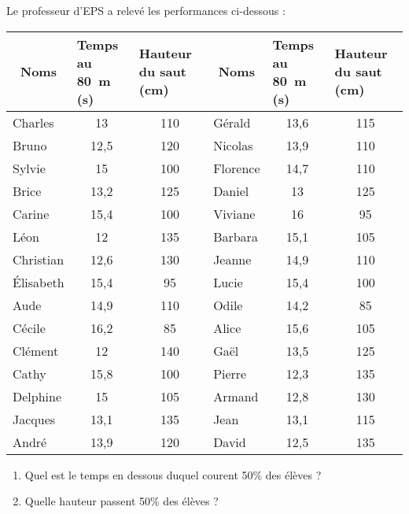 
Le professeur d'EPS a relevé les performances ci-dessous :
\begin{center}
  \begin{tabularx}{0.85\linewidth}{|l|X|X|l|X|X|}
    \hline
\multicolumn{1}{|c|}{Noms}&Temps au 80~m (s)&Hauteur du saut (cm)&\multicolumn{1}{c|}{Noms}&Temps au 80~m (s)&Hauteur du saut (cm)\\
\hline
Charles&\multicolumn{1}{c|}{13}&\multicolumn{1}{c|}{110}&Gérald&\multicolumn{1}{c|}{13,6}&\multicolumn{1}{c|}{115}\\
Bruno&\multicolumn{1}{c|}{12,5}&\multicolumn{1}{c|}{120}&Nicolas&\multicolumn{1}{c|}{13,9}&\multicolumn{1}{c|}{110}\\
Sylvie&\multicolumn{1}{c|}{15}&\multicolumn{1}{c|}{100}&Florence&\multicolumn{1}{c|}{14,7}&\multicolumn{1}{c|}{110}\\
Brice&\multicolumn{1}{c|}{13,2}&\multicolumn{1}{c|}{125}&Daniel&\multicolumn{1}{c|}{13}&\multicolumn{1}{c|}{125}\\
Carine&\multicolumn{1}{c|}{15,4}&\multicolumn{1}{c|}{100}&Viviane&\multicolumn{1}{c|}{16}&\multicolumn{1}{c|}{95}\\
Léon&\multicolumn{1}{c|}{12}&\multicolumn{1}{c|}{135}&Barbara&\multicolumn{1}{c|}{15,1}&\multicolumn{1}{c|}{105}\\
Christian&\multicolumn{1}{c|}{12,6}&\multicolumn{1}{c|}{130}&Jeanne&\multicolumn{1}{c|}{14,9}&\multicolumn{1}{c|}{110}\\
\'Elisabeth&\multicolumn{1}{c|}{15,4}&\multicolumn{1}{c|}{95}&Lucie&\multicolumn{1}{c|}{15,4}&\multicolumn{1}{c|}{100}\\
Aude&\multicolumn{1}{c|}{14,9}&\multicolumn{1}{c|}{110}&Odile&\multicolumn{1}{c|}{14,2}&\multicolumn{1}{c|}{85}\\
Cécile&\multicolumn{1}{c|}{16,2}&\multicolumn{1}{c|}{85}&Alice&\multicolumn{1}{c|}{15,6}&\multicolumn{1}{c|}{105}\\
Clément&\multicolumn{1}{c|}{12}&\multicolumn{1}{c|}{140}&Gaël&\multicolumn{1}{c|}{13,5}&\multicolumn{1}{c|}{125}\\
Cathy&\multicolumn{1}{c|}{15,8}&\multicolumn{1}{c|}{100}&Pierre&\multicolumn{1}{c|}{12,3}&\multicolumn{1}{c|}{135}\\
Delphine&\multicolumn{1}{c|}{15}&\multicolumn{1}{c|}{105}&Armand&\multicolumn{1}{c|}{12,8}&\multicolumn{1}{c|}{130}\\
Jacques&\multicolumn{1}{c|}{13,1}&\multicolumn{1}{c|}{135}&Jean&\multicolumn{1}{c|}{13,1}&\multicolumn{1}{c|}{115}\\
André&\multicolumn{1}{c|}{13,9}&\multicolumn{1}{c|}{120}&David&\multicolumn{1}{c|}{12,5}&\multicolumn{1}{c|}{135}\\
\hline
  \end{tabularx}
\end{center}
\begin{enumerate}
    \item Quel est le temps en dessous duquel courent 50\% des élèves ?  
    \item Quelle hauteur passent 50\% des élèves ?
\end{enumerate}
